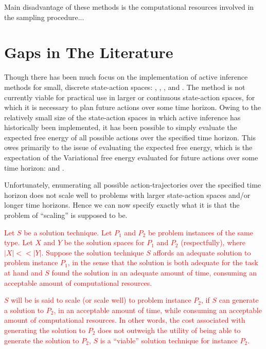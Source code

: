 \documentclass[onecolumn]{IEEEtran}
\begin{document}
Main disadvantage of these methods is the computational resources involved in the sampling procedure...

\section{Gaps in The Literature}
Though there has been much focus on the implementation of active inference methods for small, discrete state-action spaces: \textcite{Applications-of-FEP-Machine-Learning-Neuroscience}, \textcite{AIF-Discrete-Action-Spaces-Synthesis}, \textcite{Step-by-Step-Tutorial-AIF-Empirical-Data}, \textcite{Relationship-Dynamic-Programming-AIF} and \textcite{AIF-Epistemic-Value}. The method is not currently viable for practical use in larger or continuous state-action spaces, for which it is necessary to plan future actions over some time horizon. Owing to the relatively small size of the state-action spaces in which active inference has historically been implemented, it has been possible to simply evaluate the expected free energy of all possible actions over the specified time horizon. This owes primarily to the issue of evaluating the expected free energy, which is the expectation of the Variational free energy evaluated for future actions over some time horizon: \textcite{Message-Passing-Perspective-Planning-Under-AIF} and \textcite{Bayesian-Policy-Selection-Using-AIF}. 

Unfortunately, enumerating all possible action-trajectories over the specified time horizon does not scale well to problems with larger state-action spaces
and/or longer time horizons. Hence we can now specify exactly what it is that the problem of ``scaling'' is supposed to be. 

\textcolor{red}{Let $S$ be a solution technique. Let $P_1$ and $P_2$ be problem instances of the same type. Let $X$ and $Y$ be the solution spaces for $P_1$ and $P_2$ (respectfully), where $|X| << |Y|$. Suppose the solution technique $S$ affords an adequate solution to problem instance $P_1$, in the sense that the solution is both adequate for the task at hand and $S$ found the solution in an adequate amount of time, consuming an acceptable amount of computational resources.}

\textcolor{red}{$S$ will be is said to scale (or scale well) to problem instance $P_2$, if $S$ can generate a solution to $P_2$, in an acceptable amount of time, while consuming an acceptable amount of computational resources. In other words, the cost associated with generating the solution to $P_2$ does not outweigh the utility of being able to generate the solution to $P_2$, $S$ is a ``viable'' solution technique for instance $P_2$.}
\end{document}
